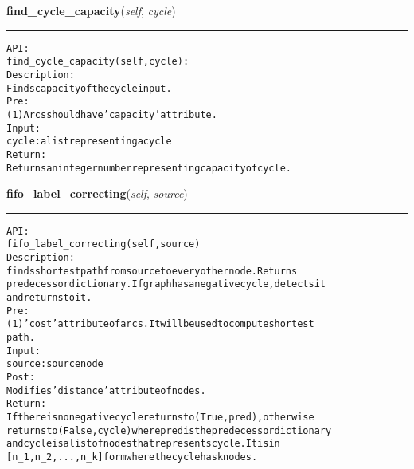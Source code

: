     \label{coinor:gimpy:graph:Graph:find_cycle_capacity}

    \vspace{0.5ex}

\hspace{.8\funcindent}\begin{boxedminipage}{\funcwidth}

    \raggedright \textbf{find\_cycle\_capacity}(\textit{self}, \textit{cycle})

    \vspace{-1.5ex}

    \rule{\textwidth}{0.5\fboxrule}
\setlength{\parskip}{2ex}
\begin{alltt}

API:
    find\_cycle\_capacity(self, cycle):
Description:
    Finds capacity of the cycle input.
Pre:
    (1) Arcs should have 'capacity' attribute.
Input:
    cycle: a list representing a cycle
Return:
    Returns an integer number representing capacity of cycle.
\end{alltt}

\setlength{\parskip}{1ex}
    \end{boxedminipage}

    \label{coinor:gimpy:graph:Graph:fifo_label_correcting}

    \vspace{0.5ex}

\hspace{.8\funcindent}\begin{boxedminipage}{\funcwidth}

    \raggedright \textbf{fifo\_label\_correcting}(\textit{self}, \textit{source})

    \vspace{-1.5ex}

    \rule{\textwidth}{0.5\fboxrule}
\setlength{\parskip}{2ex}
\begin{alltt}

API:
    fifo\_label\_correcting(self, source)
Description:
    finds shortest path from source to every other node. Returns
    predecessor dictionary. If graph has a negative cycle, detects it
    and returns to it.
Pre:
    (1) 'cost' attribute of arcs. It will be used to compute shortest
    path.
Input:
    source: source node
Post:
    Modifies 'distance' attribute of nodes.
Return:
    If there is no negative cycle returns to (True, pred), otherwise
    returns to (False, cycle) where pred is the predecessor dictionary
    and cycle is a list of nodes that represents cycle. It is in
    [n\_1, n\_2, ..., n\_k] form where the cycle has k nodes.
\end{alltt}

\setlength{\parskip}{1ex}
    \end{boxedminipage}

